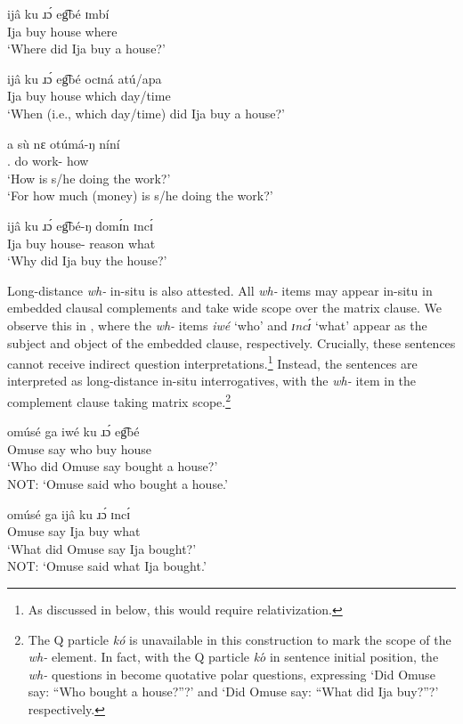 \documentclass[output=paper,colorlinks,citecolor=brown
]{langscibook}
\begin{document}
\ea \label{ex:matte:6}
\begin{xlist}

\ex \label{ex:matte:6a}
\gll ijâ ku ɹɔ́ eg͡bé ɪmbí\\
Ija \Pfv{} buy house where\\
\glt `Where did Ija buy a house?'

\ex \label{ex:matte:6b}
\gll ijâ ku ɹɔ́ eg͡bé ocɪná atú/apa\\
Ija \Pfv{} buy house which day/time\\
\glt `When (i.e., which day/time) did Ija buy a house?'

\ex \label{ex:matte:6c}
\gll a sù nɛ otúmá-ŋ níní\\
\Tsg{}.\Nom{} \Prog{} do work-\Def{} how\\
\glt `How is s/he doing the work?'\\
`For how much (money) is s/he doing the work?'

\ex \label{ex:matte:6d}
\gll ijâ ku ɹɔ́ eg͡bé-ŋ domɪ́n ɪncɪ́\\
Ija \Pfv{} buy house-\Def{} reason what\\
\glt `Why did Ija buy the house?' 

\end{xlist}
\z

Long-distance \textit{wh-} in-situ is also attested. All \textit{wh-} items may appear in-situ in embedded clausal complements and take wide scope over the matrix clause. We observe this in , where the \textit{wh-} items \textit{iwé} ‘who’  and \textit{ɪncɪ́} ‘what’  appear as the subject and object of the embedded clause, respectively. Crucially, these sentences cannot receive indirect question interpretations.\footnote{As discussed in  below, this would require relativization.} Instead, the sentences are interpreted as long-distance in-situ interrogatives, with the \textit{wh-} item in the complement clause taking matrix scope.\footnote{The Q particle \textit{kó} is unavailable in this construction to mark the scope of the \textit{wh-} element. In fact, with the Q particle \textit{ko}́ in sentence initial position, the \textit{wh-} questions in  become quotative polar questions, expressing ‘Did Omuse say: “Who bought a house?”?’ and ‘Did Omuse say: “What did Ija buy?”?’ respectively.}

\ea \label{ex:matte:7}
\begin{xlist}

\ex \label{ex:matte:7a}
\gll omúsé ga iwé ku ɹɔ́ eg͡bé\\
Omuse say who \Pfv{} buy house\\
\glt `Who did Omuse say bought a house?'\\
NOT: `Omuse said who bought a house.'

\ex \label{ex:matte:7b}
\gll omúsé ga ijâ ku ɹɔ́ ɪncɪ́\\
Omuse say Ija \Pfv{} buy what\\
\glt `What did Omuse say Ija bought?'\\
NOT: `Omuse said what Ija bought.'

\end{xlist}
\z
\end{document}
